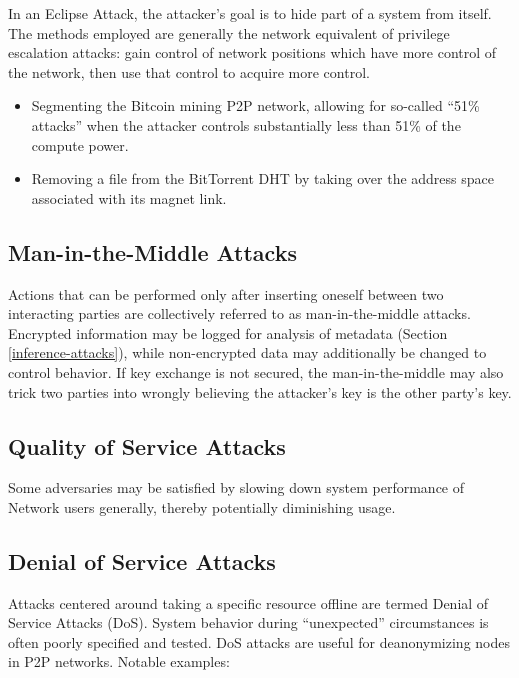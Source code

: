In an Eclipse Attack, the attacker's goal is to hide part of a system from itself. The methods employed are generally the network equivalent of privilege escalation attacks: gain control of network positions which have more control of the network, then use that control to acquire more control.

\begin{itemize}
\item Segmenting the Bitcoin mining P2P network, allowing for so-called “51\% attacks” when the attacker controls substantially less than 51\% of the compute power\cite{bitcoinEclipse}.
\item Removing a file from the BitTorrent DHT by taking over the address space associated with its magnet link\cite{bittorrentSybilAttacks}.
\end{itemize}

\subsection*{Man-in-the-Middle Attacks}
\label{mitm}

Actions that can be performed only after inserting oneself between two interacting parties are collectively referred to as man-in-the-middle attacks. Encrypted information may be logged for analysis of metadata (Section \ref{inference-attacks}), while non-encrypted data may additionally be changed to control behavior. If key exchange is not secured, the man-in-the-middle may also trick two parties into wrongly believing the attacker's key is the other party's key.

\subsection*{Quality of Service Attacks}
\label{qos}

Some adversaries may be satisfied by slowing down system performance of \Orchid{} Network users generally, thereby potentially diminishing usage.

\subsection*{Denial of Service Attacks}

Attacks centered around taking a specific resource offline are termed Denial of Service Attacks (DoS). System behavior during “unexpected” circumstances is often poorly specified and tested. DoS attacks are useful for deanonymizing nodes in P2P networks. Notable examples:

